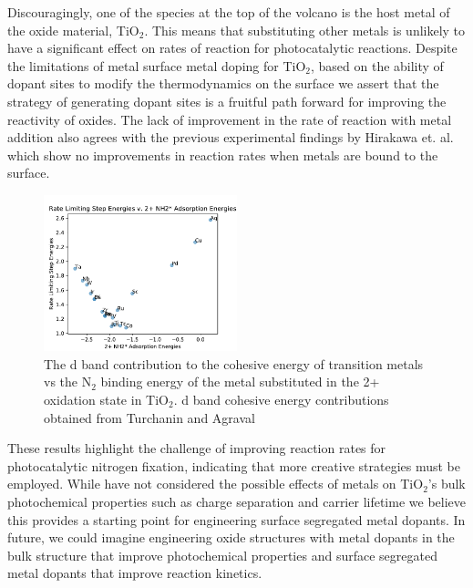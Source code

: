 \documentclass[catalysts,article,submit,moreauthors,pdftex,10pt,a4paper]{mdpi}
\theoremstyle{mdpi}
\newcounter{ex}
\newcounter{re}
\theoremstyle{mdpidefinition}
\begin{document}
Discouragingly, one of the species at the top of the volcano is the host metal of the oxide material, TiO$_2$. This means that substituting other metals is unlikely to have a significant effect on rates of reaction for photocatalytic reactions. Despite the limitations of metal surface metal doping for TiO$_2$, based on the ability of dopant sites to modify the thermodynamics on the surface we assert that the strategy of generating dopant sites is a fruitful path forward for improving the reactivity of oxides. The lack of improvement in the rate of reaction with metal addition also agrees with the previous experimental findings by Hirakawa et. al.\cite{Hirakawa_2017} which show no improvements in reaction rates when metals are bound to the surface.


\begin{figure}
    \centering
    \includegraphics[width=0.5\textwidth]{Images/NH2_v_rate_limiting.pdf}
    
    \caption{The d band contribution to the cohesive energy of transition metals vs the N$_2$ binding energy of the metal substituted in the 2+ oxidation state in TiO$_2$. d band cohesive energy contributions obtained from Turchanin and Agraval\cite{Turchanin_2008}}
    \label{fig:NH2_limiting}
\end{figure}

These results highlight the challenge of improving reaction rates for photocatalytic nitrogen fixation, indicating that more creative strategies must be employed. While have not considered the possible effects of metals on TiO$_2$'s bulk photochemical properties such as charge separation and carrier lifetime we believe this provides a starting point for engineering surface segregated metal dopants. In future, we could imagine engineering oxide structures with metal dopants in the bulk structure that improve photochemical properties and surface segregated metal dopants that improve reaction kinetics.
\end{document}
